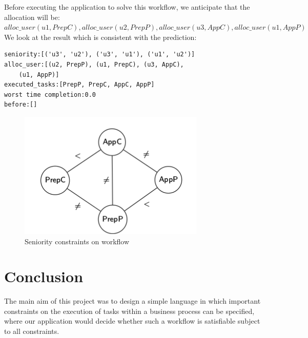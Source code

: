 \documentclass[a4paper]{report}
\begin{document}
Before executing the application to solve this workflow, we anticipate that the allocation will be:\\
$alloc\_user(u1, PrepC), alloc\_user(u2, PrepP), alloc\_user(u3, AppC), alloc\_user(u1, AppP)$\\

We look at the result which is consistent with the prediction:
\begin{lstlisting}[frame=single]
seniority:[('u3', 'u2'), ('u3', 'u1'), ('u1', 'u2')]
alloc_user:[(u2, PrepP), (u1, PrepC), (u3, AppC), 
	(u1, AppP)]
executed_tasks:[PrepP, PrepC, AppC, AppP]
worst time completion:0.0
before:[]
\end{lstlisting}

\begin{figure}
\center
\includegraphics[scale=0.75]{example_benchmark.png}
\caption{Seniority constraints on workflow}
\label{fig:Seniority constraints on workflow}
\end{figure}

\chapter{Conclusion}
The main aim of this project was to design a simple language in which important constraints on the execution of tasks within a business process can be specified, where our application would decide whether such a workflow is satisfiable subject to all constraints.\\
\end{document}
